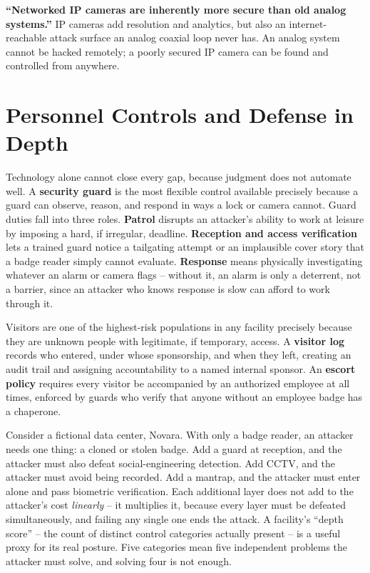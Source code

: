 \begin{misconception}
\textbf{``Networked IP cameras are inherently more secure than old analog systems.''} IP cameras
add resolution and analytics, but also an internet-reachable attack surface an analog coaxial loop
never has. An analog system cannot be hacked remotely; a poorly secured IP camera can be found and
controlled from anywhere.
\end{misconception}

\section{Personnel Controls and Defense in Depth}

Technology alone cannot close every gap, because judgment does not automate well. A
\textbf{security guard} is the most flexible control available precisely because a guard can
observe, reason, and respond in ways a lock or camera cannot. Guard duties fall into three roles. \textbf{Patrol} disrupts an attacker's ability to work at
leisure by imposing a hard, if irregular, deadline. \textbf{Reception and access verification}
lets a trained guard notice a tailgating attempt or an implausible cover story that a badge reader
simply cannot evaluate. \textbf{Response} means physically investigating whatever an alarm or
camera flags -- without it, an alarm is only a deterrent, not a barrier, since an attacker who
knows response is slow can afford to work through it.

Visitors are one of the highest-risk populations in any facility precisely because they are
unknown people with legitimate, if temporary, access. A \textbf{visitor log} records who entered,
under whose sponsorship, and when they left, creating an audit trail and assigning accountability
to a named internal sponsor. An \textbf{escort policy} requires every visitor be accompanied by an
authorized employee at all times, enforced by guards who verify that anyone without an employee
badge has a chaperone.

\begin{example}
Consider a fictional data center, Novara. With only a badge reader, an attacker needs one thing: a
cloned or stolen badge. Add a guard at reception, and the attacker must also defeat
social-engineering detection. Add CCTV, and the attacker must avoid being recorded. Add a mantrap,
and the attacker must enter alone and pass biometric verification. Each additional layer does not
add to the attacker's cost \emph{linearly} -- it multiplies it, because every layer must be
defeated simultaneously, and failing any single one ends the attack. A facility's ``depth score'' --
the count of distinct control categories actually present -- is a useful proxy for its real
posture. Five categories mean five independent problems the attacker must solve, and solving four
is not enough.
\end{example}

